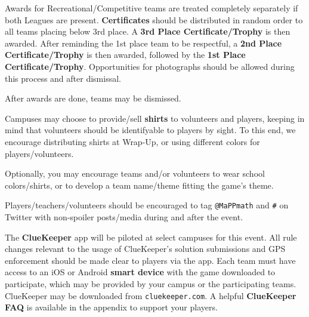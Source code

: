 Awards for Recreational/Competitive teams are treated completely separately
if both Leagues are present.
\textbf{Certificates} should be distributed in random order to all teams placing
below 3rd place. A \textbf{3rd Place Certificate/Trophy} is then awarded.
After reminding the 1st place team to be respectful, a
\textbf{2nd Place Certificate/Trophy} is then awarded, followed by the
\textbf{1st Place Certificate/Trophy}. Opportunities for photographs should
be allowed during this process and after dismissal.

After awards are done, teams may be dismissed.


Campuses may choose to provide/sell \textbf{shirts} to volunteers and players,
keeping in mind that volunteers should be identifyable to players by sight.
To this end, we encourage distributing shirts at Wrap-Up, or using different
colors for players/volunteers.

Optionally, you may encourage teams and/or volunteers to
wear school colors/shirts, or to develop a team name/theme fitting the
game's theme.


Players/teachers/volunteers should be encouraged to tag \texttt{@MaPPmath}
and \texttt{\#\phEventAbbr} on Twitter with non-spoiler posts/media during
and after the event.


The \textbf{ClueKeeper} app will be piloted at select campuses for this
event. All rule changes relevant to the usage of ClueKeeper's
solution submissions and GPS enforcement should be made clear to players
via the app. Each team must have access to an iOS or Android
\textbf{smart device} with the game downloaded to participate, which
may be provided by your campus or the participating teams.
ClueKeeper may be downloaded from \texttt{cluekeeper.com}. A helpful
\textbf{ClueKeeper FAQ} is available in the appendix to support your players.

